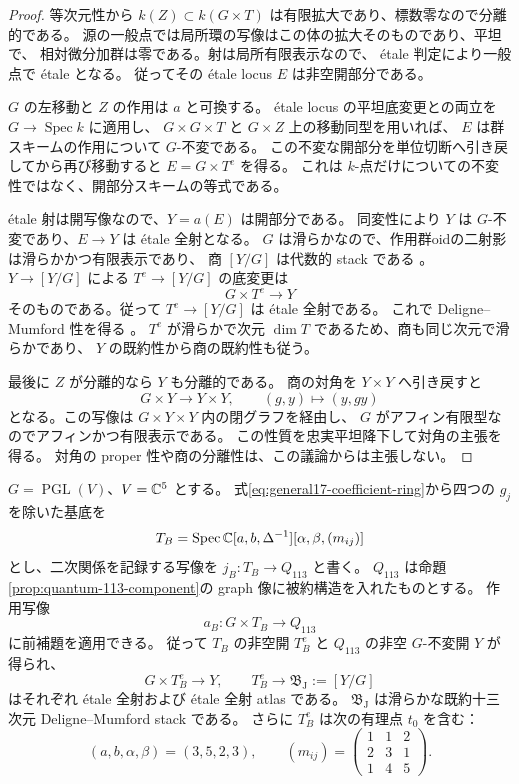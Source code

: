 \begin{proof}
等次元性から $k(Z)\subset k(G\times T)$ は有限拡大であり、標数零なので分離的である。
源の一般点では局所環の写像はこの体の拡大そのものであり、平坦で、
相対微分加群は零である。射は局所有限表示なので、
étale 判定\cite[Lemma~29.37.15]{StacksAlgebraicChart}により一般点で étale となる。
従ってその étale locus $E$ は非空開部分である。

$G$ の左移動と $Z$ の作用は $a$ と可換する。
étale locus の平坦底変更との両立\cite[Lemma~29.37.17]{StacksAlgebraicChart}を $G\to\operatorname{Spec}k$ に適用し、
$G\times G\times T$ と $G\times Z$ 上の移動同型を用いれば、
$E$ は群スキームの作用について $G$-不変である。
この不変な開部分を単位切断へ引き戻してから再び移動すると
$E=G\times T^e$ を得る。
これは $k$-点だけについての不変性ではなく、開部分スキームの等式である。

étale 射は開写像\cite[Lemma~29.37.13]{StacksAlgebraicChart}なので、$Y=a(E)$ は開部分である。
同変性により $Y$ は $G$-不変であり、$E\to Y$ は étale 全射となる。
$G$ は滑らかなので、作用群oidの二射影は滑らかかつ有限表示であり、
商 $[Y/G]$ は代数的 stack である
\cite[Theorem~97.17.2]{StacksAlgebraicChart}。
$Y\to[Y/G]$ による $T^e\to[Y/G]$ の底変更は
\[
 G\times T^e\longrightarrow Y
\]
そのものである。従って $T^e\to[Y/G]$ は étale 全射である。
これで Deligne--Mumford 性を得る
\cite[Theorem~101.21.6]{StacksAlgebraicChart}。
$T^e$ が滑らかで次元 $\dim T$ であるため、商も同じ次元で滑らかであり、
$Y$ の既約性から商の既約性も従う。

最後に $Z$ が分離的なら $Y$ も分離的である。
商の対角を $Y\times Y$ へ引き戻すと
\[
 G\times Y\longrightarrow Y\times Y,\qquad(g,y)\longmapsto(y,gy)
\]
となる。この写像は $G\times Y\times Y$ 内の閉グラフを経由し、
$G$ がアフィン有限型なのでアフィンかつ有限表示である。
この性質を忠実平坦降下して対角の主張を得る。
対角の proper 性や商の分離性は、この議論からは主張しない。
\end{proof}

\begin{proposition}
\label{prop:jacobian-ambient-etale-chart}
$G=\operatorname{PGL}(V)$、$V=\mathbb C^5$ とする。
式\eqref{eq:general17-coefficient-ring}から四つの $g_j$ を除いた基底を
\[
 T_B=\operatorname{Spec}
 \mathbb C[a,b,\Delta^{-1}][\alpha,\beta,(m_{ij})]
\]
とし、二次関係を記録する写像を $j_B:T_B\to Q_{113}$ と書く。
$Q_{113}$ は命題\ref{prop:quantum-113-component}の graph 像に被約構造を入れたものとする。
作用写像
\[
 a_B:G\times T_B\longrightarrow Q_{113}
\]
に前補題を適用できる。
従って $T_B$ の非空開 $T_B^e$ と $Q_{113}$ の非空 $G$-不変開 $Y$ が得られ、
\[
 G\times T_B^e\longrightarrow Y,\qquad
 T_B^e\longrightarrow\mathfrak B_{\mathrm J}:=[Y/G]
\]
はそれぞれ étale 全射および étale 全射 atlas である。
$\mathfrak B_{\mathrm J}$ は滑らかな既約十三次元 Deligne--Mumford stack である。
さらに $T_B^e$ は次の有理点 $t_0$ を含む：
\[
 (a,b,\alpha,\beta)=(3,5,2,3),\qquad
 (m_{ij})=
 \begin{pmatrix}1&1&2\\2&3&1\\1&4&5\end{pmatrix}.
\]
\end{proposition}

